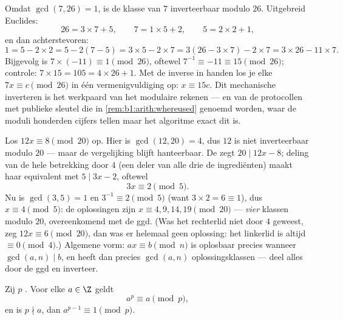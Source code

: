 \begin{example}\label{ex:b1:arith:inv7mod26}
Omdat $\gcd(7, 26) = 1$, is de klasse van $7$ inverteerbaar modulo $26$.
Uitgebreid Euclides:
\[
26 = 3 \times 7 + 5, \qquad
7 = 1 \times 5 + 2, \qquad
5 = 2 \times 2 + 1 ,
\]
en dan achterstevoren:
\[
1 = 5 - 2 \times 2 = 5 - 2(7 - 5) = 3 \times 5 - 2 \times 7
= 3(26 - 3 \times 7) - 2 \times 7 = 3 \times 26 - 11 \times 7 .
\]
Bijgevolg is $7 \times (-11) \equiv 1 \pmod{26}$, oftewel $7^{-1} \equiv
-11 \equiv 15 \pmod{26}$; controle: $7 \times 15 = 105 = 4 \times 26 +
1$. Met de inverse in handen los je elke  $7x \equiv c
\pmod{26}$ in één vermenigvuldiging op: $x \equiv 15c$. Dit mechanische
inverteren is het werkpaard van het modulaire rekenen --- en van de
protocollen met publieke sleutel die in
\cref{rem:b1:arith:whereused} genoemd worden, waar de moduli honderden
cijfers tellen maar het algoritme exact dit is.
\end{example}

\begin{example}\label{ex:b1:arith:noninvertible}
Los $12x \equiv 8 \pmod{20}$ op. Hier is $\gcd(12, 20) = 4$, dus $12$ is
niet inverteerbaar modulo $20$ --- maar de vergelijking blijft
hanteerbaar. De  zegt $20 \mid 12x - 8$; deling van de hele
betrekking door $4$ (een deler van alle drie de ingrediënten) maakt haar
equivalent met $5 \mid 3x - 2$, oftewel
\[
3x \equiv 2 \pmod 5 .
\]
Nu is $\gcd(3, 5) = 1$ en $3^{-1} \equiv 2 \pmod 5$ (want $3 \times 2 = 6
\equiv 1$), dus $x \equiv 4 \pmod 5$: de oplossingen zijn $x \equiv 4, 9,
14, 19 \pmod{20}$ --- \emph{vier} klassen modulo $20$, overeenkomend met
de ggd. (Was het rechterlid niet  door $4$ geweest, zeg $12x
\equiv 6 \pmod{20}$, dan was er helemaal geen oplossing: het linkerlid is
altijd $\equiv 0 \pmod 4$.) Algemene vorm: $ax \equiv b \pmod n$ is
oplosbaar precies wanneer $\gcd(a, n) \mid b$, en heeft dan precies
$\gcd(a, n)$ oplossingsklassen --- deel alles door de ggd en inverteer.
\end{example}

\begin{theorem}\label{thm:b1:arith:fermat}
Zij $p$ . Voor elke $a \in \Z$ geldt
\[
a^p \equiv a \pmod p,
\]
en is $p \nmid a$, dan $a^{p-1} \equiv 1 \pmod p$.
\end{theorem}

